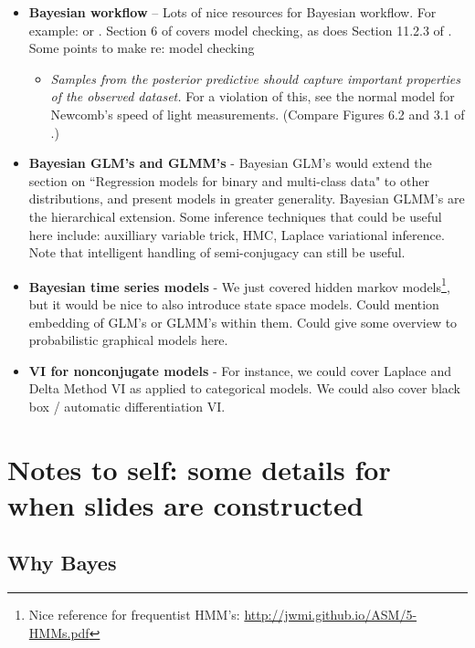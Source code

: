\documentclass{article} %
\begin{document}
\begin{itemize}
\item \textbf{Bayesian workflow} -- Lots of nice resources for Bayesian workflow.    For example: \cite{gelman2020bayesian} or \cite{gabry2019visualization}.   Section 6 of \cite{gelman2013bayesian} covers model checking,  as does  Section 11.2.3 of \cite{davison2003statistical}.    Some points to make re: model checking
	\begin{itemize}
	\item \textit{Samples from the posterior predictive should capture important properties of the observed dataset.}  For a violation of this,  see the normal model for Newcomb's speed of light measurements.  (Compare Figures 6.2 and 3.1 of \cite{gelman2013bayesian}.)
	\end{itemize}
\item \textbf{Bayesian GLM's and GLMM's} - Bayesian GLM's would extend the section on ``Regression models for binary and multi-class data" to other distributions, and present models in greater generality.  Bayesian GLMM's are the hierarchical extension.  Some inference techniques that could be useful here include:  auxilliary variable trick, HMC, Laplace variational inference. Note that intelligent handling of semi-conjugacy can still be useful.
\item \textbf{Bayesian time series models} -  We just covered hidden markov models\footnote{Nice reference for frequentist HMM's: \url{http://jwmi.github.io/ASM/5-HMMs.pdf}}, but it would be nice to also introduce state space models.    Could mention embedding of GLM's or GLMM's within them.   Could give some overview to probabilistic graphical models here. 
\item \textbf{VI for nonconjugate models} - For instance, we could cover Laplace and Delta Method VI as applied to categorical models.   We could also cover black box / automatic differentiation VI.
\end{itemize}

\section{Notes to self:  some details for when slides are constructed}

\subsection{Why Bayes}
\end{document}
